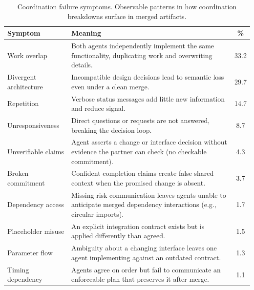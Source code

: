 \begin{table}[t]
  \centering
  \small
  \caption{Coordination failure symptoms. Observable patterns in how coordination breakdowns surface in merged artifacts.}
  \label{tab:failure_symptoms}

  \begingroup
  \setlength{\tabcolsep}{4pt}
  \setlength{\extrarowheight}{1.5pt}
  \renewcommand{\arraystretch}{1.25}

\begin{tabular}{
  p{}
  p{}
  c
}
    \toprule
    \textbf{Symptom} & \textbf{Meaning} & \textbf{\%} \\
    \midrule
    Work overlap & Both agents independently implement the same functionality, duplicating work and overwriting details. & 33.2 \\
    Divergent architecture & Incompatible design decisions lead to semantic loss even under a clean merge. & 29.7 \\
    Repetition & Verbose status messages add little new information and reduce signal. & 14.7 \\
    Unresponsiveness & Direct questions or requests are not answered, breaking the decision loop. & 8.7 \\
    Unverifiable claims & Agent asserts a change or interface decision without evidence the partner can check (no checkable commitment). & 4.3 \\
    Broken commitment & Confident completion claims create false shared context when the promised change is absent. & 3.7 \\
    Dependency access & Missing risk communication leaves agents unable to anticipate merged dependency interactions (e.g., circular imports). & 1.7 \\
    Placeholder misuse & An explicit integration contract exists but is applied differently than agreed. & 1.5 \\
    Parameter flow & Ambiguity about a changing interface leaves one agent implementing against an outdated contract. & 1.3 \\
    Timing dependency & Agents agree on order but fail to communicate an enforceable plan that preserves it after merge. & 1.1 \\
    \bottomrule
  \end{tabular}
  \endgroup
\end{table}
